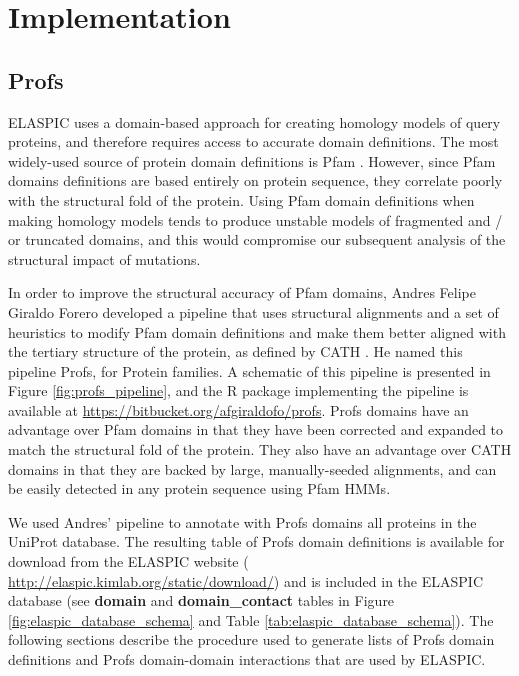 
\chapter{Implementation} \label{chap:implementation}


\section{Profs}

ELASPIC uses a domain-based approach for creating homology models of query proteins, and therefore requires access to accurate domain definitions. The most widely-used source of protein domain definitions is Pfam \cite{punta_pfam_2012}. However, since Pfam domains definitions are based entirely on protein sequence, they correlate poorly with the structural fold of the protein. Using Pfam domain definitions when making homology models tends to produce unstable models of fragmented and / or truncated domains, and this would compromise our subsequent analysis of the structural impact of mutations.

In order to improve the structural accuracy of Pfam domains, Andres Felipe Giraldo Forero developed a pipeline that uses structural alignments and a set of heuristics to modify Pfam domain definitions and make them better aligned with the tertiary structure of the protein, as defined by CATH \cite{cuff_extending_2011}. He named this pipeline Profs, for Protein families. A schematic of this pipeline is presented in Figure \ref{fig:profs_pipeline}, and the R package implementing the pipeline is available at \url{https://bitbucket.org/afgiraldofo/profs}. Profs domains have an advantage over Pfam domains in that they have been corrected and expanded to match the structural fold of the protein. They also have an advantage over CATH domains in that they are backed by large, manually-seeded alignments, and can be easily detected in any protein sequence using Pfam HMMs.

We used Andres' pipeline to annotate with Profs domains all proteins in the UniProt database. The resulting table of Profs domain definitions is available for download from the ELASPIC website ( \url{http://elaspic.kimlab.org/static/download/}) and is included in the ELASPIC database (see \textbf{domain} and \textbf{domain\_contact} tables in Figure \ref{fig:elaspic_database_schema} and Table \ref{tab:elaspic_database_schema}). The following sections describe the procedure used to generate lists of Profs domain definitions and Profs domain-domain interactions that are used by ELASPIC.

